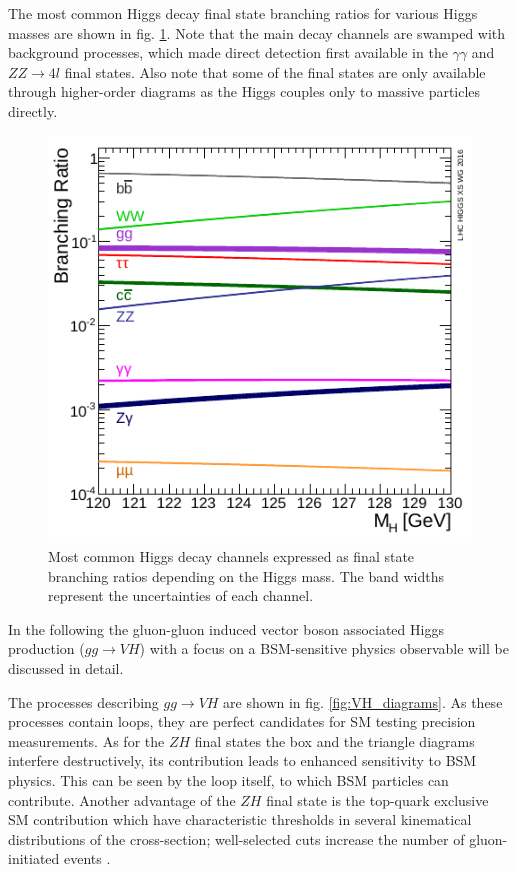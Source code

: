 The most common Higgs decay final state branching ratios for various Higgs masses are shown in fig. \ref{fig:higgsbranch}. Note that the main decay channels are swamped with background processes, which made direct detection first available in the $\gamma\gamma$ and $ZZ\rightarrow4l$ final states. Also note that some of the final states are only available through higher-order diagrams as the Higgs couples only to massive particles directly.

\begin{figure}[h!]
	\centering
	\includegraphics[width=0.6\linewidth]{figures/theory/higgsdecay.pdf}
	\caption{Most common Higgs decay channels expressed as final state branching ratios depending on the Higgs mass. The band widths represent the uncertainties of each channel. \cite{HiggsCrossSections}}
	\label{fig:higgsbranch}
\end{figure}

In the following the gluon-gluon induced vector boson associated Higgs production ($gg\rightarrow VH$) with a focus on a BSM-sensitive physics observable will be discussed in detail.


The processes describing $gg\rightarrow VH$ are shown in fig. \ref{fig:VH_diagrams}. As these processes contain loops, they are perfect candidates for SM testing precision measurements. As for the $ZH$ final states the box and the triangle diagrams interfere destructively, its contribution leads to enhanced sensitivity to BSM physics. This can be seen by the loop itself, to which BSM particles can contribute. Another advantage of the $ZH$ final state is the top-quark exclusive SM contribution which have characteristic thresholds in several kinematical distributions of the cross-section; well-selected cuts increase the number of gluon-initiated events \cite{Harlander_2018}.

